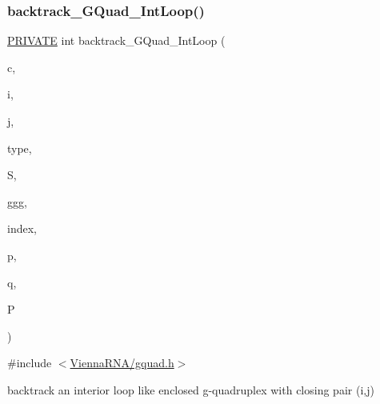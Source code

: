 \subsubsection{\texorpdfstring{backtrack\+\_\+\+G\+Quad\+\_\+\+Int\+Loop()}{backtrack\_GQuad\_IntLoop()}}
{\footnotesize\ttfamily \mbox{\hyperlink{group__utils_ga5e151c615eda34903514212f05a5ccf8}{P\+R\+I\+V\+A\+TE}} int backtrack\+\_\+\+G\+Quad\+\_\+\+Int\+Loop (\begin{DoxyParamCaption}\item[{int}]{c,  }\item[{int}]{i,  }\item[{int}]{j,  }\item[{int}]{type,  }\item[{short $\ast$}]{S,  }\item[{int $\ast$}]{ggg,  }\item[{int $\ast$}]{index,  }\item[{int $\ast$}]{p,  }\item[{int $\ast$}]{q,  }\item[{\mbox{\hyperlink{group__energy__parameters_ga8a69ca7d787e4fd6079914f5343a1f35}{vrna\+\_\+param\+\_\+t}} $\ast$}]{P }\end{DoxyParamCaption})}



{\ttfamily \#include $<$\mbox{\hyperlink{gquad_8h}{Vienna\+R\+N\+A/gquad.\+h}}$>$}

backtrack an interior loop like enclosed g-\/quadruplex with closing pair (i,j)


